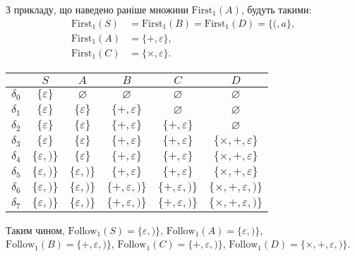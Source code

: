 З прикладу, що наведено раніше множини $\text{First}_1(A)$, будуть такими:
\begin{align*}
	\text{First}_1 (S) &= \text{First}_1 (B) = \text{First}_1 (D) = \{(, a\}, \\
	\text{First}_1 (A) &= \{+, \varepsilon\}, \\
	\text{First}_1 (C) &= \{\times, \varepsilon\}.
\end{align*}

\begin{table}[H]
	\centering
	\begin{tabular}{|c|c|c|c|c|c|}
		\hline
		& $S$ & $A$ & $B$ & $C$ & $D$ \\ \hline
		$\delta_0$ & $\{\varepsilon\}$ & $\varnothing$ & $\varnothing$ & $\varnothing$ & $\varnothing$ \\ \hline
		$\delta_1$ & $\{\varepsilon\}$ & $\{\varepsilon\}$ & $\{+,\varepsilon\}$ & $\varnothing$ & $\varnothing$ \\ \hline
		$\delta_2$ & $\{\varepsilon\}$ & $\{\varepsilon\}$ & $\{+,\varepsilon\}$ & $\{+,\varepsilon\}$ & $\varnothing$ \\ \hline
		$\delta_3$ & $\{\varepsilon\}$ & $\{\varepsilon\}$ & $\{+,\varepsilon\}$ & $\{+,\varepsilon\}$ & $\{\times,+,\varepsilon\}$ \\ \hline
		$\delta_4$ & $\{\varepsilon,)\}$ & $\{\varepsilon\}$ & $\{+,\varepsilon\}$ & $\{+,\varepsilon\}$ & $\{\times,+,\varepsilon\}$ \\ \hline
		$\delta_5$ & $\{\varepsilon,)\}$ & $\{\varepsilon,)\}$ & $\{+,\varepsilon\}$ & $\{+,\varepsilon\}$ & $\{\times,+,\varepsilon\}$ \\ \hline
		$\delta_6$ & $\{\varepsilon,)\}$ & $\{\varepsilon,)\}$ & $\{+,\varepsilon,)\}$ & $\{+,\varepsilon,)\}$ & $\{\times,+,\varepsilon,)\}$ \\ \hline
		$\delta_7$ & $\{\varepsilon,)\}$ & $\{\varepsilon,)\}$ & $\{+,\varepsilon,)\}$ & $\{+,\varepsilon,)\}$ & $\{\times,+,\varepsilon,)\}$ \\ \hline
	\end{tabular}
\end{table}

Таким чином, $\text{Follow}_1 (S) = \{\varepsilon, )\}$, $\text{Follow}_1 (A) = \{\varepsilon, )\}$, $\text{Follow}_1 (B) = \{+,\varepsilon, )\}$, $\text{Follow}_1 (C) = \{+,\varepsilon, )\}$, $\text{Follow}_1 (D) = \{\times,+,\varepsilon, )\}$.

